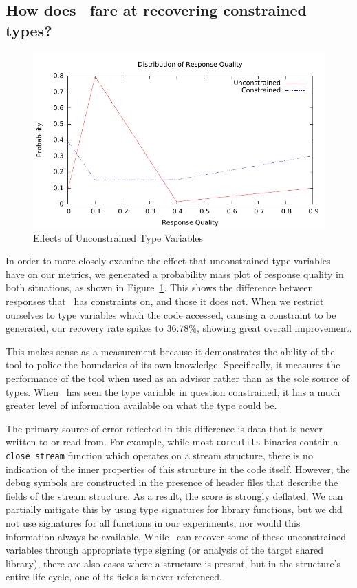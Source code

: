 \subsection{How does \bitr\ fare at recovering constrained types?}
\begin{figure}
	\begin{center}
\includegraphics[scale=1.1]{bitr/quality.pdf}
	\end{center}
\caption{Effects of Unconstrained Type Variables}
\label{fig:unconst}
\end{figure}

In order to more closely examine the effect that unconstrained type variables have on our metrics, we generated a probability mass plot of response quality in both situations, as shown in Figure~\ref{fig:unconst}. This shows the
difference between responses that \bitr\ has constraints on, and those it does not.
When we restrict ourselves to type variables which the code accessed, causing a constraint to be generated, our recovery rate spikes to 36.78\%, showing great overall improvement.

This makes sense as a measurement because it demonstrates the ability of the tool to police the boundaries of its own knowledge. Specifically, it measures the performance of the tool when used as an advisor rather than as the sole source of types. When \bitr\ has seen the type variable in question constrained, it has a much greater level of information available on what the type could be.

The primary source of error reflected in this difference is data that is never written to or read from. For example, while most \texttt{coreutils} binaries contain a \texttt{close\_stream} function which operates on a stream structure, there is no indication of the inner properties of this structure in the code itself. However, the debug symbols are constructed in the presence of header files that describe the fields of the stream structure. As a result, the score is strongly deflated.
We can partially mitigate this by using type signatures for library functions, but we did not use signatures for all functions in our experiments, nor would this information always be available.
While \bitr\ can recover some of these unconstrained variables through appropriate type signing (or analysis of the target shared library), there are also cases where a structure is present, but in the structure's entire life cycle, one of its fields is never referenced.

